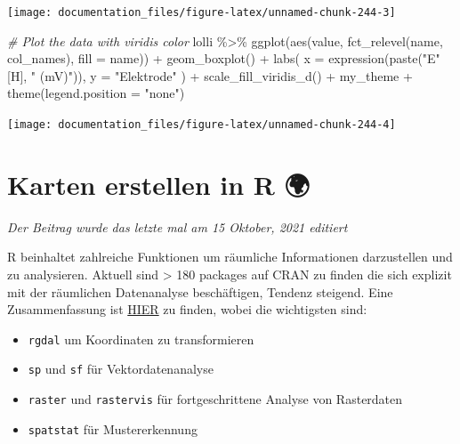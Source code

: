 \documentclass[
]{article}
\newenvironment{Shaded}{\begin{snugshade}}{\end{snugshade}}
\newcommand{\AttributeTok}[1]{\textcolor[rgb]{0.77,0.63,0.00}{#1}}
\newcommand{\CommentTok}[1]{\textcolor[rgb]{0.56,0.35,0.01}{\textit{#1}}}
\newcommand{\FunctionTok}[1]{\textcolor[rgb]{0.00,0.00,0.00}{#1}}
\newcommand{\NormalTok}[1]{#1}
\newcommand{\SpecialCharTok}[1]{\textcolor[rgb]{0.00,0.00,0.00}{#1}}
\newcommand{\StringTok}[1]{\textcolor[rgb]{0.31,0.60,0.02}{#1}}
\providecommand{\tightlist}{%
  \setlength{\itemsep}{0pt}\setlength{\parskip}{0pt}}
\begin{document}
\begin{center}\texttt{[image: documentation\_files/figure-latex/unnamed-chunk-244-3]} \end{center}

\begin{Shaded}
\begin{Highlighting}[]

\CommentTok{\# Plot the data with viridis color}
\NormalTok{lolli }\SpecialCharTok{\%\textgreater{}\%}
  \FunctionTok{ggplot}\NormalTok{(}\FunctionTok{aes}\NormalTok{(value, }\FunctionTok{fct\_relevel}\NormalTok{(name, col\_names), }\AttributeTok{fill =}\NormalTok{ name)) }\SpecialCharTok{+} 
  \FunctionTok{geom\_boxplot}\NormalTok{() }\SpecialCharTok{+}
  \FunctionTok{labs}\NormalTok{(}
    \AttributeTok{x =} \FunctionTok{expression}\NormalTok{(}\FunctionTok{paste}\NormalTok{(}\StringTok{"E"}\NormalTok{ [H], }\StringTok{" (mV)"}\NormalTok{)),}
    \AttributeTok{y =} \StringTok{"Elektrode"}
\NormalTok{  ) }\SpecialCharTok{+}
  \FunctionTok{scale\_fill\_viridis\_d}\NormalTok{() }\SpecialCharTok{+}
\NormalTok{  my\_theme }\SpecialCharTok{+}
  \FunctionTok{theme}\NormalTok{(}\AttributeTok{legend.position =} \StringTok{"none"}\NormalTok{)}
\end{Highlighting}
\end{Shaded}

\begin{center}\texttt{[image: documentation\_files/figure-latex/unnamed-chunk-244-4]} \end{center}

\hypertarget{karten-erstellen-in-r}{%
\section{Karten erstellen in R 🌍}\label{karten-erstellen-in-r}}

\emph{Der Beitrag wurde das letzte mal am 15 Oktober, 2021 editiert}

R beinhaltet zahlreiche Funktionen um räumliche Informationen darzustellen und zu analysieren. Aktuell sind \textgreater{} 180 packages auf CRAN zu finden die sich explizit mit der räumlichen Datenanalyse beschäftigen, Tendenz steigend. Eine Zusammenfassung ist \href{https://cran.r-project.org/web/views/Spatial.html}{HIER} zu finden, wobei die wichtigsten sind:

\begin{itemize}
\tightlist
\item
  \texttt{rgdal} um Koordinaten zu transformieren
\item
  \texttt{sp} und \texttt{sf} für Vektordatenanalyse
\item
  \texttt{raster} und \texttt{rastervis} für fortgeschrittene Analyse von Rasterdaten
\item
  \texttt{spatstat} für Mustererkennung
\end{itemize}
\end{document}
